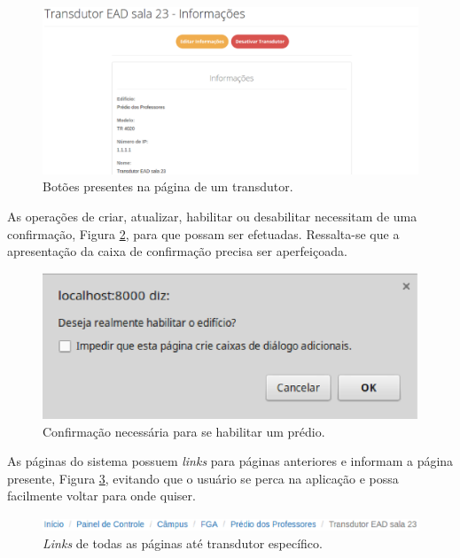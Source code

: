 \begin{figure}[!h]
    \centering
    \includegraphics[scale=0.4]{figuras/buttons_2.eps}
    \caption{Botões presentes na página de um transdutor.}
    \label{buttons_2}
\end{figure}

As operações de criar, atualizar, habilitar ou desabilitar necessitam de uma confirmação, Figura \ref{block}, para que possam ser efetuadas. Ressalta-se que a apresentação da caixa de confirmação precisa ser aperfeiçoada.

\begin{figure}[!h]
    \centering
    \includegraphics[scale=0.7]{figuras/block.eps}
    \caption{Confirmação necessária para se habilitar um prédio.}
    \label{block}
\end{figure}

As páginas do sistema possuem \textit{links} para páginas anteriores e informam a página presente, Figura \ref{links}, evitando que o usuário se perca na aplicação e possa facilmente voltar para onde quiser.

\begin{figure}[!h]
    \centering
    \includegraphics[scale=0.7]{figuras/links.eps}
    \caption{\textit{Links} de todas as páginas até transdutor específico.}
    \label{links}
\end{figure}

